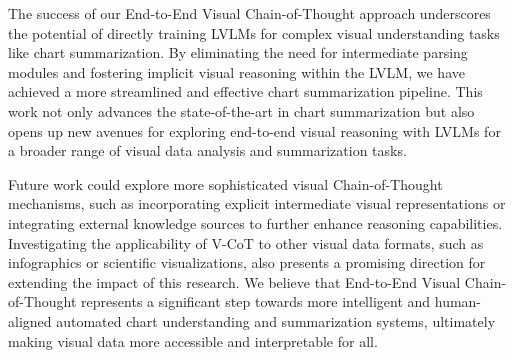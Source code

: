 The success of our End-to-End Visual Chain-of-Thought approach underscores the potential of directly training LVLMs for complex visual understanding tasks like chart summarization.  By eliminating the need for intermediate parsing modules and fostering implicit visual reasoning within the LVLM, we have achieved a more streamlined and effective chart summarization pipeline.  This work not only advances the state-of-the-art in chart summarization but also opens up new avenues for exploring end-to-end visual reasoning with LVLMs for a broader range of visual data analysis and summarization tasks.

Future work could explore more sophisticated visual Chain-of-Thought mechanisms, such as incorporating explicit intermediate visual representations or integrating external knowledge sources to further enhance reasoning capabilities.  Investigating the applicability of V-CoT to other visual data formats, such as infographics or scientific visualizations, also presents a promising direction for extending the impact of this research.  We believe that End-to-End Visual Chain-of-Thought represents a significant step towards more intelligent and human-aligned automated chart understanding and summarization systems, ultimately making visual data more accessible and interpretable for all.
